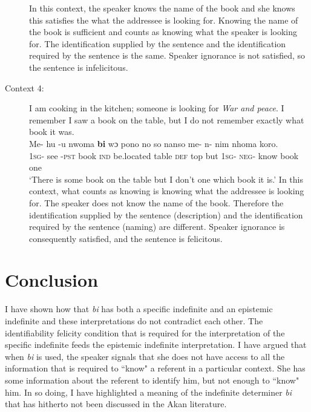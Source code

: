 \documentclass[output=paper,modfonts,nonflat,draftmode]{langsci/langscibook}
\begin{document}
\begin{description}
 \z In this context, the speaker knows the name of the book and she knows this satisfies the what the addressee is looking for. Knowing the name of the book is sufficient and counts as knowing what the speaker is looking for. The identification supplied by the sentence and the identification required by the sentence is the same. Speaker ignorance is not satisfied, so the sentence is infelicitous.
\item[Context 4:] I am cooking in the kitchen; someone is looking for \emph{War and peace}. I remember I saw a book on the table, but I do not remember exactly what book it was.
\ea\label{owusu:ex62b}\\
\gll Me- hu -u nwoma \textbf{bi} wɔ pono no so nanso me- n- nim nhoma koro.\\
	     \textsc{1sg}- see -\textsc{pst}  book \textsc{ind}  be.located table \textsc{def} top but \textsc{1sg}- \textsc{neg}- know book one\\

\glt `There is some book on the table but I don't one which book it is.'
\z In this context, what counts as knowing is knowing what the addressee is looking for. The speaker does not know the name of the book. Therefore the identification supplied by the sentence (description) and the identification required by the sentence (naming) are different. Speaker ignorance is consequently satisfied, and the sentence is felicitous. 
\end{description}

\section{Conclusion}\label{sec:owusu:5}

I have shown how that \emph{bi} has both a  specific indefinite and an epistemic indefinite and these interpretations do not contradict each other. The identifiability felicity condition that is required for the interpretation of the specific indefinite feeds the epistemic indefinite interpretation. I have argued that when \emph{bi} is used, the speaker signals that she does not have access to all the information that is required to ``know" a referent in a particular context. She has some information about the referent to identify him, but not enough to ``know" him. In so doing, I have highlighted a meaning of the indefinite determiner \emph{bi} that has hitherto not been discussed in the Akan literature. 
\end{document}
